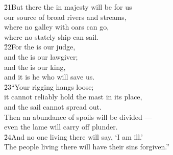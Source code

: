 \begin{poetry}
\poeml \v{21}But there the  in majesty will be for us \\
\poemll    our source of broad rivers and streams, \\
\poeml where no galley with oars can go, \\
\poemll    where no stately ship can sail. \\
\poeml \v{22}For the  is our judge, \\
\poemll    and the  is our lawgiver; \\
\poeml and the  is our king, \\
\poemll    and it is he who will save us. \\
\poeml \v{23}``Your rigging hangs loose; \\
\poemll    it cannot reliably hold the mast in its place, \\
\poemlll       and the sail cannot spread out. \\
\poeml Then an abundance of spoils will be divided --- \\
\poemll    even the lame will carry off plunder. \\
\poeml \v{24}And no one living there will say, `I am ill.' \\
\poemll    The people living there will have their sins forgiven.''
\end{poetry}

